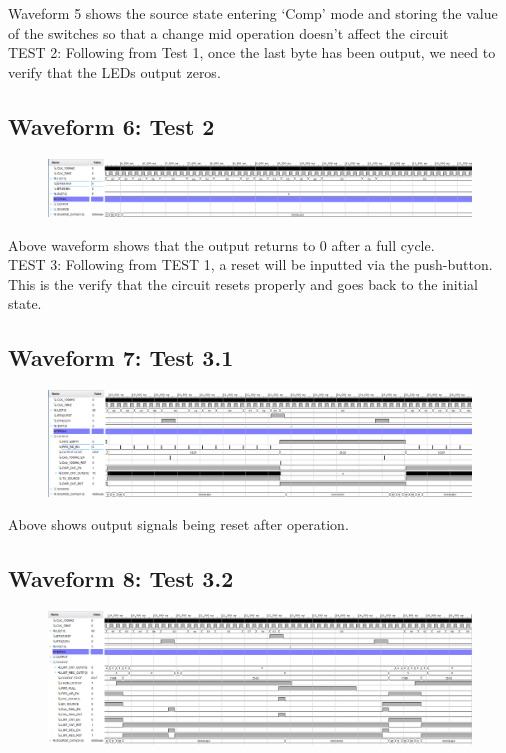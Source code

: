 \documentclass[11pt]{report}
\begin{document}
Waveform 5 shows the source state entering `Comp' mode and storing the value of the switches so that a change mid 
operation doesn't affect the circuit\\

TEST 2: Following from Test 1, once the last byte has been output, we need to verify that the LEDs output zeros.

\subsection*{Waveform 6: Test 2 }
\begin{figure}[H]
       \includegraphics[width=\columnwidth]{Assets/Test2.png}
\end{figure}

Above waveform shows that the output returns to 0 after a full cycle.\\

TEST 3: Following from TEST 1, a reset will be inputted via the push-button. This is the verify that the circuit resets
properly and goes back to the initial state.

\subsection*{Waveform 7: Test 3.1 }
\begin{figure}[H]
       \includegraphics[width=\columnwidth]{Assets/Test3_1.png}
\end{figure}

Above shows output signals being reset after operation.

\subsection*{Waveform 8: Test 3.2 }
\begin{figure}[H]
       \includegraphics[width=\columnwidth]{Assets/Test3_2.png}
\end{figure}
\end{document}
